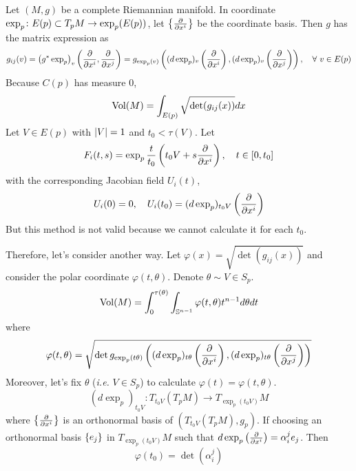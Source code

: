\begin{enumerate}[label=\arabic{*}]
	Let $(M,g)$ be a complete Riemannian manifold. In coordinate $\exp_p \colon E(p) \subset T_pM \rightarrow \exp_p(E(p))$, let $\left\{\frac{\partial}{\partial x^i}\right\}$ be the coordinate basis. Then $g$ has the matrix expression as
	\begin{equation*}
		g_{ij}(v) = \left(g^*\exp_p\right)_v\left(\frac{\partial}{\partial x^i},\frac{\partial}{\partial x^j}\right) = g_{\exp_p(v)}\left((d\exp_p)_v\left(\frac{\partial}{\partial x^i}\right),(d\exp_p)_v\left(\frac{\partial}{\partial x^j}\right)\right),\quad \forall~v \in E(p)
	\end{equation*}
	Because $C(p)$ has measure $0$,
	\begin{equation*}
		\operatorname{Vol}(M) = \int_{E(p)}\sqrt{\det(g_{ij}(x))}dx
	\end{equation*}
	Let $V \in E(p)$ with $\left\lvert V\right\lvert = 1$ and $t_0 < \tau(V)$. Let
	\begin{equation*}
	 	F_i(t,s) = \exp_p \frac{t}{t_0}\left(t_0V + s\frac{\partial}{\partial x^i}\right),\quad t \in [0,t_0]
	\end{equation*} 
	with the corresponding Jacobian field $U_i(t)$,
	\begin{equation*}
		U_i(0) = 0,\quad U_i(t_0) = (d\exp_p)_{t_0V}\left(\frac{\partial}{\partial x^i}\right)
	\end{equation*}
	But this method is not valid because we cannot calculate it for each $t_0$.

	\noindent Therefore, let's consider another way. Let $\varphi(x) = \sqrt{\det(g_{ij}(x))}$ and consider the polar coordinate $\varphi(t,\theta)$. Denote $\theta \sim V \in S_p$.
	\begin{equation*}
		\operatorname{Vol}(M) = \int_0^{\tau(\theta)} \int_{\mathbb{S}^{n-1}}\varphi(t,\theta) t^{n-1}d\theta dt 
	\end{equation*}
	where
	\begin{equation*}
		\varphi(t,\theta) = \sqrt{\det g_{\exp_p(t\theta)}\left((d\exp_p)_{t\theta}\left(\frac{\partial}{\partial x^i}\right),(d\exp_p)_{t\theta}\left(\frac{\partial}{\partial x^j}\right)\right)}
	\end{equation*}
	Moreover, let's fix $\theta$ (\emph{i.e.} $V \in S_p$) to calculate $\varphi(t) = \varphi(t,\theta)$.
	\begin{equation*}
		(d\exp_p)_{t_0V} \colon T_{t_0V}(T_pM) \longrightarrow T_{\exp_p(t_0V)}M
	\end{equation*}
	where $\left\{\frac{\partial}{\partial x^i}\right\}$ is an orthonormal basis of $(T_{t_0V}(T_pM),g_p)$. If choosing an orthonormal basis $\left\{e_j\right\}$ in $T_{\exp_p(t_0V)}M$ such that $d\exp_p\left(\frac{\partial}{\partial x^i}\right) = \alpha_i^je_j$. Then
	\begin{equation*}
		\varphi(t_0) = \det(\alpha_i^j)
	\end{equation*}


\end{enumerate}
